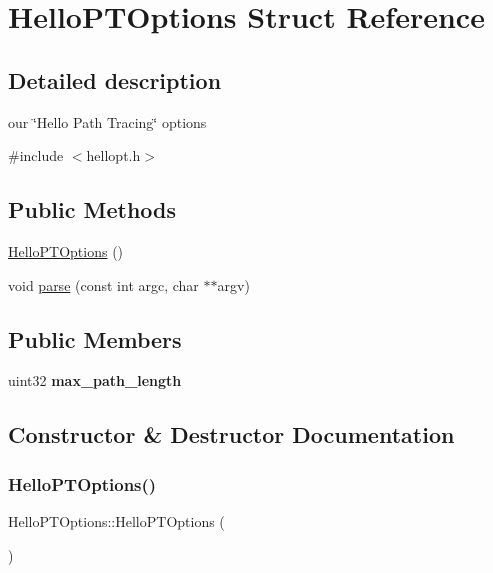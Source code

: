 \hypertarget{struct_hello_p_t_options}{}\section{Hello\+P\+T\+Options Struct Reference}
\label{struct_hello_p_t_options}


\subsection{Detailed description}
our \char`\"{}\+Hello Path Tracing\char`\"{} options 

{\ttfamily \#include $<$hellopt.\+h$>$}

\subsection*{Public Methods}
\begin{DoxyCompactItemize}
\item 
\hyperlink{struct_hello_p_t_options_a244c96683d3c5d345bdf4b6b8aa9c249}{Hello\+P\+T\+Options} ()
\item 
void \hyperlink{struct_hello_p_t_options_a540d006dee6aff8ee5e8b3cfc8b0fa0b}{parse} (const int argc, char $\ast$$\ast$argv)
\end{DoxyCompactItemize}
\subsection*{Public Members}
\begin{DoxyCompactItemize}
\item 
\mbox{\label{struct_hello_p_t_options_a7a22bb6990a291d333ae4c11c5d0c7b7}} 
uint32 {\bfseries max\+\_\+path\+\_\+length}
\end{DoxyCompactItemize}


\subsection{Constructor \& Destructor Documentation}
\mbox{\label{struct_hello_p_t_options_a244c96683d3c5d345bdf4b6b8aa9c249}} 
\subsubsection{\texorpdfstring{Hello\+P\+T\+Options()}{HelloPTOptions()}}
{\footnotesize\ttfamily Hello\+P\+T\+Options\+::\+Hello\+P\+T\+Options (\begin{DoxyParamCaption}{ }\end{DoxyParamCaption})\hspace{0.3cm}{\ttfamily [inline]}}

